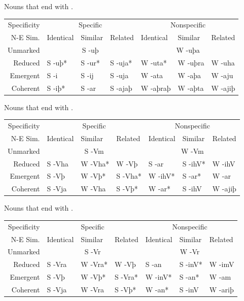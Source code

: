 \documentclass{book}
\begin{document}
\begin{tablenf}
  \caption{Nouns that end with .}
  \centering
  \begin{tabular}{r|lll|lll}
    Specificity & \multicolumn{3}{c|}{Specific} & \multicolumn{3}{c}{Nonspecific} \\
    N-E \bs{} Sim. & Identical & Similar & Related & Identical & Similar & Related \\
    \hline
    Unmarked & \multicolumn{3}{c|}{S -uþ} & \multicolumn{3}{c}{W -uþa} \\
    Reduced & S -uþ* & S -ur* & S -uja* & W -uta* & W -uþra & W -uha \\
    Emergent & S -i & S -ij & S -uja & W -ata & W -aþa & W -aju \\
    Coherent & S -iþ* & S -ar & S -ajaþ & W -aþraþ & W -aþta & W -ajiþ \\
  \end{tabular}
\end{tablenf}

\begin{tablenf}
  \caption{Nouns that end with . \label{table:declensionlast}}
  \centering
  \begin{tabular}{r|lll|lll}
    Specificity & \multicolumn{3}{c|}{Specific} & \multicolumn{3}{c}{Nonspecific} \\
    N-E \bs{} Sim. & Identical & Similar & Related & Identical & Similar & Related \\
    \hline
    Unmarked & \multicolumn{3}{c|}{S -Vm} & \multicolumn{3}{c}{W -Vm} \\
    Reduced & S -Vha & W -Vha* & W -Vþ & S -ar & S -ihV* & W -ihV \\
    Emergent & S -Vþ & W -Vþ* & S -Vha* & W -ihV* & S -ar* & W -ar \\
    Coherent & S -Vja & W -Vha & S -Vþ* & W -ar* & S -ihV & W -ajiþ \\
  \end{tabular}
\end{tablenf}

\begin{tablenf}
  \caption{Nouns that end with .}
  \centering
  \begin{tabular}{r|lll|lll}
    Specificity & \multicolumn{3}{c|}{Specific} & \multicolumn{3}{c}{Nonspecific} \\
    N-E \bs{} Sim. & Identical & Similar & Related & Identical & Similar & Related \\
    \hline
    Unmarked & \multicolumn{3}{c|}{S -Vr} & \multicolumn{3}{c}{W -Vr} \\
    Reduced & S -Vra & W -Vra* & W -Vþ & S -an & S -inV* & W -imV \\
    Emergent & S -Vþ & W -Vþ* & S -Vra* & W -inV* & S -an* & W -am \\
    Coherent & S -Vja & W -Vra & S -Vþ* & W -an* & S -inV & W -ariþ \\
  \end{tabular}
\end{tablenf}
\end{document}
